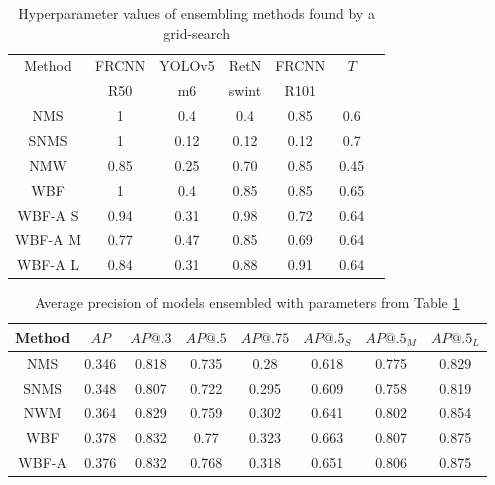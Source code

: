 \begin{table}[H]
    \begin{tabular}{|c|c|c|c|c|c|c|}
        \hline
        Method  & FRCNN & YOLOv5 & RetN  & FRCNN & $T$  \\
                & R50   & m6     & swint & R101  &      \\ \hline
        NMS     & 1     & 0.4    & 0.4   & 0.85  & 0.6  \\ \hline
        SNMS    & 1     & 0.12   & 0.12  & 0.12  & 0.7  \\ \hline
        NMW     & 0.85  & 0.25   & 0.70  & 0.85  & 0.45 \\ \hline
        WBF     & 1     & 0.4    & 0.85  & 0.85  & 0.65 \\ \hline
        WBF-A S & 0.94  & 0.31   & 0.98  & 0.72  & 0.64 \\ \hline
        WBF-A M & 0.77  & 0.47   & 0.85  & 0.69  & 0.64 \\ \hline
        WBF-A L & 0.84  & 0.31   & 0.88  & 0.91  & 0.64 \\ \hline
    \end{tabular}
    \caption{Hyperparameter values of ensembling methods found by a grid-search}
    \label{tab:ensemble_params:grid_search}
\end{table}


\begin{table}[H]
    \centering
    \begin{tabular}{|c|c|c|c|c|c|c|c|}
        \hline
        Method & $AP$  & $AP@.3$ & $AP@.5$ & $AP@.75$ & $AP@.5_S$ & $AP@.5_M$ & $AP@.5_L$ \\ \hline
        NMS    & 0.346 & 0.818   & 0.735   & 0.28     & 0.618     & 0.775     & 0.829     \\ \hline
        SNMS   & 0.348 & 0.807   & 0.722   & 0.295    & 0.609     & 0.758     & 0.819     \\ \hline
        NWM    & 0.364 & 0.829   & 0.759   & 0.302    & 0.641     & 0.802     & 0.854     \\ \hline
        WBF    & 0.378 & 0.832   & 0.77    & 0.323    & 0.663     & 0.807     & 0.875     \\ \hline
        WBF-A  & 0.376 & 0.832   & 0.768   & 0.318    & 0.651     & 0.806     & 0.875     \\ \hline
    \end{tabular}
    \caption{Average precision of models ensembled with parameters from Table \ref{tab:ensemble_params:grid_search}}
    \label{tab:precision:grid_search}
\end{table}


